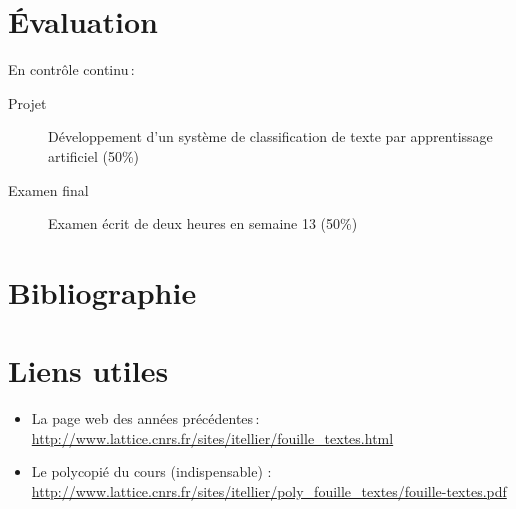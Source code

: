 \documentclass[a4paper, 11pt]{article}
\begin{document}
\section*{Évaluation}
En contrôle continu :

\begin{description}
    \item[Projet] Développement d'un système de classification de texte par apprentissage artificiel (50\%)
    \item[Examen final] Examen écrit de deux heures en semaine 13 (50\%)
\end{description}

\section*{Bibliographie}
\printbibliography[heading=none]

\section*{Liens utiles}
\begin{itemize}
    \item La page web des années précédentes : \url{http://www.lattice.cnrs.fr/sites/itellier/fouille_textes.html}
    \item Le polycopié du cours (indispensable) :  \url{http://www.lattice.cnrs.fr/sites/itellier/poly_fouille_textes/fouille-textes.pdf}
\end{itemize}
\end{document}
